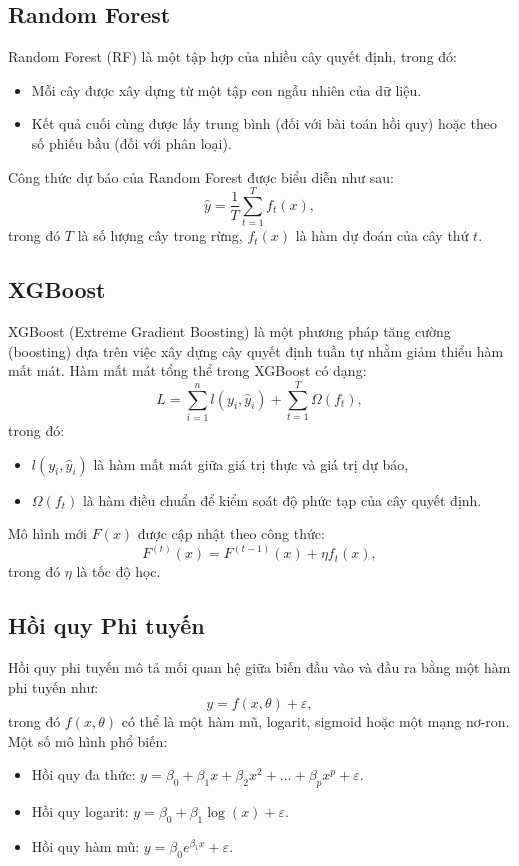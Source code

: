 \subsection{Random Forest}
Random Forest (RF) là một tập hợp của nhiều cây quyết định, trong đó:
\begin{itemize}
    \item Mỗi cây được xây dựng từ một tập con ngẫu nhiên của dữ liệu.
    \item Kết quả cuối cùng được lấy trung bình (đối với bài toán hồi quy) hoặc theo số phiếu bầu (đối với phân loại).
\end{itemize}
Công thức dự báo của Random Forest được biểu diễn như sau:
\begin{equation}
    \hat{y} = \frac{1}{T} \sum_{t=1}^{T} f_t(x),
\end{equation}
trong đó $T$ là số lượng cây trong rừng, $f_t(x)$ là hàm dự đoán của cây thứ $t$.

\subsection{XGBoost}
XGBoost (Extreme Gradient Boosting) là một phương pháp tăng cường (boosting) dựa trên việc xây dựng cây quyết định tuần tự nhằm giảm thiểu hàm mất mát.
Hàm mất mát tổng thể trong XGBoost có dạng:
\begin{equation}
    L = \sum_{i=1}^{n} l(y_i, \hat{y}_i) + \sum_{t=1}^{T} \Omega(f_t),
\end{equation}
trong đó:
\begin{itemize}
    \item $l(y_i, \hat{y}_i)$ là hàm mất mát giữa giá trị thực và giá trị dự báo,
    \item $\Omega(f_t)$ là hàm điều chuẩn để kiểm soát độ phức tạp của cây quyết định.
\end{itemize}
Mô hình mới $F(x)$ được cập nhật theo công thức:
\begin{equation}
    F^{(t)}(x) = F^{(t-1)}(x) + \eta f_t(x),
\end{equation}
trong đó $\eta$ là tốc độ học.

\subsection{Hồi quy Phi tuyến}
Hồi quy phi tuyến mô tả mối quan hệ giữa biến đầu vào và đầu ra bằng một hàm phi tuyến như:
\begin{equation}
    y = f(x, \theta) + \varepsilon,
\end{equation}
trong đó $f(x, \theta)$ có thể là một hàm mũ, logarit, sigmoid hoặc một mạng nơ-ron.
Một số mô hình phổ biến:
\begin{itemize}
    \item Hồi quy đa thức: $y = \beta_0 + \beta_1 x + \beta_2 x^2 + \dots + \beta_p x^p + \varepsilon$.
    \item Hồi quy logarit: $y = \beta_0 + \beta_1 \log(x) + \varepsilon$.
    \item Hồi quy hàm mũ: $y = \beta_0 e^{\beta_1 x} + \varepsilon$.
\end{itemize}

